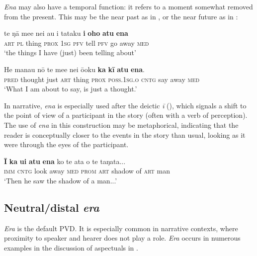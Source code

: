 \textit{Ena} may also have a temporal function: it refers to a moment somewhat removed from the present. This may be the near past as in , or the near future as in :

\ea\label{ex:7.163}
\gll te ŋā me{\ꞌ}e nei au i tataku \textbf{i} \textbf{oho} \textbf{atu} \textbf{ena} \\
\textsc{art} \textsc{pl} thing \textsc{prox} \textsc{1sg} \textsc{pfv} tell \textsc{pfv} go away \textsc{med} \\

\glt 
‘the things I have (just) been telling about’ \textstyleExampleref{[R360.037]} 
\z

\ea\label{ex:7.164}
\gll He mana{\ꞌ}u nō te me{\ꞌ}e nei ō{\ꞌ}oku \textbf{ka} \textbf{kī} \textbf{atu} \textbf{ena}. \\
\textsc{pred} thought just \textsc{art} thing \textsc{prox} \textsc{poss.1sg.o} \textsc{cntg} say away \textsc{med} \\

\glt 
‘What I am about to say, is just a thought.’ \textstyleExampleref{[R361.015]} 
\z

In narrative, \textit{ena} is especially used after the deictic  \textit{{\ꞌ}ī} (), which signals a shift to the point of view of a participant in the story (often with a verb of perception). The use of \textit{ena} in this construction may be metaphorical, indicating that the reader is conceptually closer to the events in the story than usual, looking as it were through the eyes of the participant.

\ea\label{ex:7.165}
\gll \textbf{{\ꞌ}}\textbf{Ī} \textbf{ka} \textbf{u{\ꞌ}i} \textbf{atu} \textbf{ena} ko te {\ꞌ}ata o te taŋata... \\
\textsc{imm} \textsc{cntg} look away \textsc{med} \textsc{prom} \textsc{art} shadow of \textsc{art} man \\

\glt 
‘Then he saw the shadow of a man...’\textstyleExampleref{ [R304.095]}\textstyleExampleref{} 
\z
{}
\subsection{Neutral/distal \textit{era}~}\label{sec:7.6.4}
\textit{Era} is the default PVD. It is especially common in narrative contexts, where proximity to speaker and hearer does not play a role. \textit{Era} occurs in numerous examples in the discussion of aspectuals in . 

